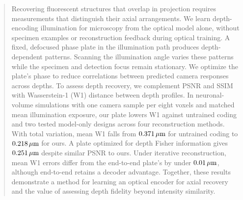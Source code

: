 \begin{abstract}
Recovering fluorescent structures that overlap in projection requires measurements that distinguish their axial arrangements. We learn depth-encoding illumination for microscopy from the optical model alone, without specimen examples or reconstruction feedback during optical training. A fixed, defocused phase plate in the illumination path produces depth-dependent patterns. Scanning the illumination angle varies these patterns while the specimen and detection focus remain stationary. We optimize the plate's phase to reduce correlations between predicted camera responses across depths. To assess depth recovery, we complement PSNR and SSIM with Wasserstein-1 (W1) distance between depth profiles. In neuronal-volume simulations with one camera sample per eight voxels and matched mean illumination exposure, our plate lowers W1 against untrained coding and two tested model-only designs across four reconstruction methods. With total variation, mean W1 falls from $0.371\um$ for untrained coding to $0.218\um$ for ours. A plate optimized for depth Fisher information gives $0.251\um$ despite similar PSNR to ours. Under iterative reconstruction, mean W1 errors differ from the end-to-end plate's by under $0.01\um$, although end-to-end retains a decoder advantage. Together, these results demonstrate a method for learning an optical encoder for axial recovery and the value of assessing depth fidelity beyond intensity similarity.
\end{abstract}
